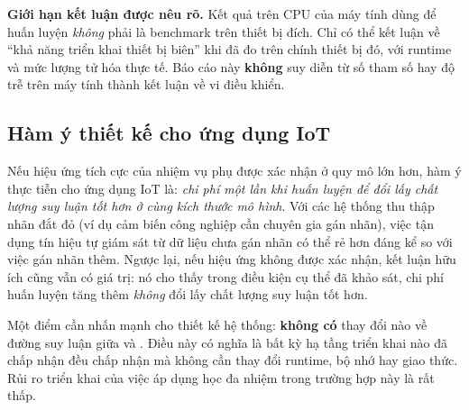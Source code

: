 \begin{limbox}
\textbf{Giới hạn kết luận được nêu rõ.} Kết quả trên CPU của máy tính dùng để huấn luyện
\emph{không} phải là benchmark trên thiết bị đích. Chỉ có thể kết luận về \enquote{khả năng
triển khai thiết bị biên} khi đã đo trên chính thiết bị đó, với runtime và mức lượng tử hóa
thực tế. Báo cáo này \textbf{không} suy diễn từ số tham số hay độ trễ trên máy tính thành kết
luận về vi điều khiển.
\end{limbox}

\subsection{Hàm ý thiết kế cho ứng dụng IoT}
\label{sec:iot-implications}

Nếu hiệu ứng tích cực của nhiệm vụ phụ được xác nhận ở quy mô lớn hơn, hàm ý thực tiễn cho
ứng dụng IoT là: \emph{chi phí một lần khi huấn luyện để đổi lấy chất lượng suy luận tốt hơn ở
cùng kích thước mô hình}. Với các hệ thống thu thập nhãn đắt đỏ (ví dụ cảm biến công nghiệp
cần chuyên gia gán nhãn), việc tận dụng tín hiệu tự giám sát từ dữ liệu chưa gán nhãn có thể
rẻ hơn đáng kể so với việc gán nhãn thêm. Ngược lại, nếu hiệu ứng không được xác nhận, kết luận
hữu ích cũng vẫn có giá trị: nó cho thấy trong điều kiện cụ thể đã khảo sát, chi phí huấn luyện
tăng thêm \emph{không} đổi lấy chất lượng suy luận tốt hơn.

Một điểm cần nhấn mạnh cho thiết kế hệ thống: \textbf{không có} thay đổi nào về đường suy luận
giữa  và . Điều này có nghĩa là bất kỳ hạ tầng triển khai nào đã chấp nhận
 đều chấp nhận  mà không cần thay đổi runtime, bộ nhớ hay giao thức. Rủi ro
triển khai của việc áp dụng học đa nhiệm trong trường hợp này là rất thấp.
